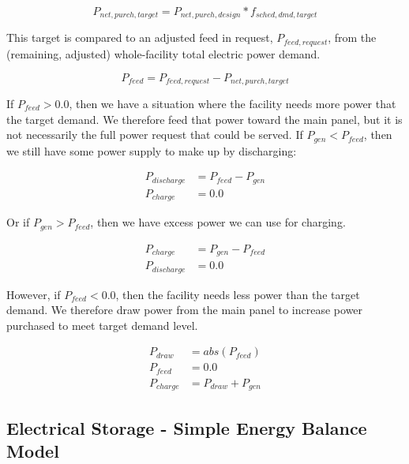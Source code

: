 \begin{equation}
  {P_{net,purch,target}} = {P_{net,purch,design}} *{f_{sched,dmd,target}}
\end{equation}

This target is compared to an adjusted feed in request, ${P_{feed, request}}$, from the (remaining, adjusted) whole-facility total electric power demand. 

\begin{equation}
  {P_{feed}} = {P_{feed,request}} - {P_{net,purch,target}}
\end{equation}

If ${P_{feed}} > 0.0$, then we have a situation where the facility needs more power that the target demand.  We therefore feed that power toward the main panel, but it is not necessarily the full power request that could be served.  If ${P_{gen}} < {P_{feed}}$, then we still have some power supply to make up by discharging:

\begin{equation}
  \begin{array}{rl}
    {P_{discharge}} &=  {P_{feed}} - {P_{gen}} \\
    {P_{charge}} &= 0.0
  \end{array}
\end{equation}

Or if ${P_{gen}} > {P_{feed}}$, then we have excess power we can use for charging.

\begin{equation}
  \begin{array}{rl}
    {P_{charge}} &= {P_{gen}} - {P_{feed}} \\
    {P_{discharge}} &= 0.0
  \end{array}
\end{equation}

However, if ${P_{feed}} < 0.0$, then the facility needs less power than the target demand.  We therefore draw power from the main panel to increase power purchased to meet target demand level. 

\begin{equation}
  \begin{array}{rl}
   {P_{draw}} &= { abs( {P_{feed}} )} \\
    {P_{feed}} &= 0.0 \\
    {P_{charge}} &= {P_{draw}} + {P_{gen}}
  \end{array}
\end{equation}

\subsection{Electrical Storage - Simple Energy Balance Model}

